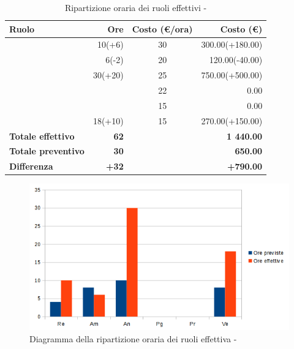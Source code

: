 \documentclass[12pt,a4paper]{article}
\begin{document}
\begin{table}[H]
	\begin{center}
		\begin{tabular}{l r c r}
			\toprule
			\textbf{Ruolo}	& \textbf{Ore} & \textbf{Costo (\euro/ora)}	& \textbf{Costo (\euro)} \\ \midrule
			\midrule
            \RE{} & 10(+6) & 30 & 300.00(+180.00) \\ \midrule
            \AM{} & 6(-2) & 20 & 120.00(-40.00) \\ \midrule
            \AN{} & 30(+20) & 25 & 750.00(+500.00) \\ \midrule
			\PG{} & & 22 & 0.00 \\ \midrule
			\PR{} & & 15 & 0.00 \\ \midrule
            \VR{} & 18(+10) & 15 & 270.00(+150.00) \\ \midrule
            \textbf{Totale effettivo} & \textbf{62} &  & \textbf{1 440.00} \\ \midrule
			\textbf{Totale preventivo} & \textbf{30} &  & \textbf{650.00} \\ \midrule
			\textbf{Differenza} & \textbf{+32} &  & \textbf{+790.00} \\ \midrule
			\bottomrule
		\end{tabular}
		\caption{Ripartizione oraria dei ruoli effettivi - \FAD{}}
	\end{center}
\end{table}

\begin{center}
	\begin{figure}[H]
		\centering
		\includegraphics[width=\textwidth]{../img/diagrammaBarreAnalisiDiDettaglioConsuntivo.png}
		\caption{Diagramma della ripartizione oraria dei ruoli effettiva - \FA{}}
	\end{figure}
\end{center}
\end{document}
